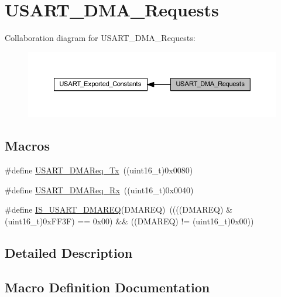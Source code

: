 \hypertarget{group___u_s_a_r_t___d_m_a___requests}{}\section{U\+S\+A\+R\+T\+\_\+\+D\+M\+A\+\_\+\+Requests}
\label{group___u_s_a_r_t___d_m_a___requests}
Collaboration diagram for U\+S\+A\+R\+T\+\_\+\+D\+M\+A\+\_\+\+Requests\+:
\nopagebreak
\begin{figure}[H]
\begin{center}
\leavevmode
\includegraphics[width=350pt]{group___u_s_a_r_t___d_m_a___requests}
\end{center}
\end{figure}
\subsection*{Macros}
\begin{DoxyCompactItemize}
\item 
\#define \hyperlink{group___u_s_a_r_t___d_m_a___requests_gae38097d8f82ba969c9812194022cae9a}{U\+S\+A\+R\+T\+\_\+\+D\+M\+A\+Req\+\_\+\+Tx}~((uint16\+\_\+t)0x0080)
\item 
\#define \hyperlink{group___u_s_a_r_t___d_m_a___requests_gaf33c13abb942251afab3297d8b8362ca}{U\+S\+A\+R\+T\+\_\+\+D\+M\+A\+Req\+\_\+\+Rx}~((uint16\+\_\+t)0x0040)
\item 
\#define \hyperlink{group___u_s_a_r_t___d_m_a___requests_ga8be7a899d21d82de2ee0a763b4564dc3}{I\+S\+\_\+\+U\+S\+A\+R\+T\+\_\+\+D\+M\+A\+R\+EQ}(D\+M\+A\+R\+EQ)~((((D\+M\+A\+R\+EQ) \& (uint16\+\_\+t)0x\+F\+F3\+F) == 0x00) \&\& ((\+D\+M\+A\+R\+E\+Q) != (uint16\+\_\+t)0x00))
\end{DoxyCompactItemize}


\subsection{Detailed Description}


\subsection{Macro Definition Documentation}
\mbox{\label{group___u_s_a_r_t___d_m_a___requests_ga8be7a899d21d82de2ee0a763b4564dc3}} 

